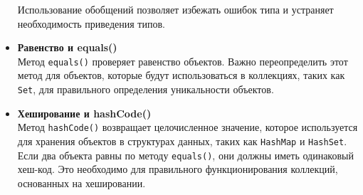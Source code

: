 \begin{itemize}
    Использование обобщений позволяет избежать ошибок типа и устраняет необходимость приведения типов.
    
    \item \textbf{Равенство и equals()} \\
    Метод \texttt{equals()} проверяет равенство объектов. Важно переопределить этот метод для объектов, которые будут использоваться в коллекциях, таких как \texttt{Set}, для правильного определения уникальности объектов.
    
    \item \textbf{Хеширование и hashCode()} \\
    Метод \texttt{hashCode()} возвращает целочисленное значение, которое используется для хранения объектов в структурах данных, таких как \texttt{HashMap} и \texttt{HashSet}. Если два объекта равны по методу \texttt{equals()}, они должны иметь одинаковый хеш-код. Это необходимо для правильного функционирования коллекций, основанных на хешировании.
\end{itemize}

